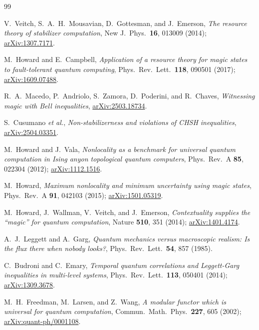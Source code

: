\documentclass[aps,pra,twocolumn,superscriptaddress,longbibliography,floatfix,nofootinbib]{revtex4-2}
\begin{document}
\begin{thebibliography}{99}

V.~Veitch, S.~A.~H.~Mousavian, D.~Gottesman, and J.~Emerson,
\emph{The resource theory of stabilizer computation},
New J.\ Phys.\ \textbf{16}, 013009 (2014);
\href{https://arxiv.org/abs/1307.7171}{arXiv:1307.7171}.

M.~Howard and E.~Campbell,
\emph{Application of a resource theory for magic states to
fault-tolerant quantum computing},
Phys.\ Rev.\ Lett.\ \textbf{118}, 090501 (2017);
\href{https://arxiv.org/abs/1609.07488}{arXiv:1609.07488}.

R.~A.~Macedo, P.~Andriolo, S.~Zamora, D.~Poderini, and R.~Chaves,
\emph{Witnessing magic with Bell inequalities},
\href{https://arxiv.org/abs/2503.18734}{arXiv:2503.18734}.

S.~Cusumano \emph{et al.},
\emph{Non-stabilizerness and violations of CHSH inequalities},
\href{https://arxiv.org/abs/2504.03351}{arXiv:2504.03351}.

M.~Howard and J.~Vala,
\emph{Nonlocality as a benchmark for universal quantum computation in
Ising anyon topological quantum computers},
Phys.\ Rev.\ A \textbf{85}, 022304 (2012);
\href{https://arxiv.org/abs/1112.1516}{arXiv:1112.1516}.

M.~Howard,
\emph{Maximum nonlocality and minimum uncertainty using magic states},
Phys.\ Rev.\ A \textbf{91}, 042103 (2015);
\href{https://arxiv.org/abs/1501.05319}{arXiv:1501.05319}.

M.~Howard, J.~Wallman, V.~Veitch, and J.~Emerson,
\emph{Contextuality supplies the ``magic'' for quantum computation},
Nature \textbf{510}, 351 (2014);
\href{https://arxiv.org/abs/1401.4174}{arXiv:1401.4174}.

A.~J.~Leggett and A.~Garg,
\emph{Quantum mechanics versus macroscopic realism: Is the flux there
when nobody looks?},
Phys.\ Rev.\ Lett.\ \textbf{54}, 857 (1985).

C.~Budroni and C.~Emary,
\emph{Temporal quantum correlations and Leggett-Garg inequalities in
multi-level systems},
Phys.\ Rev.\ Lett.\ \textbf{113}, 050401 (2014);
\href{https://arxiv.org/abs/1309.3678}{arXiv:1309.3678}.

M.~H.~Freedman, M.~Larsen, and Z.~Wang,
\emph{A modular functor which is universal for quantum computation},
Commun.\ Math.\ Phys.\ \textbf{227}, 605 (2002);
\href{https://arxiv.org/abs/quant-ph/0001108}{arXiv:quant-ph/0001108}.


\end{thebibliography}
\end{document}
